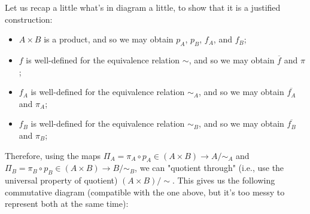 \documentclass[12pt, letterpaper, twoside]{report}
\begin{document}

Let us recap a little what's in diagram a little, to show that it is a justified construction:
\begin{itemize}
	\item $A \times B$ is a product, and so we may obtain $p_A$, $p_B$, $f_A$, and $f_B$;
    \item $f$ is well-defined for the equivalence relation $\sim$, and so we may obtain $\overline{f}$ and $\pi$;
    \item $f_A$ is well-defined for the equivalence relation $\sim_A$, and so we may obtain $\overline{f_A}$ and $\pi_A$;
    \item $f_B$ is well-defined for the equivalence relation $\sim_B$, and so we may obtain $\overline{f_B}$ and $\pi_B$;
\end{itemize}

Therefore, using the maps $\Pi_A = \pi_A \circ p_A \in (A \times B) \to A/\sim_A$ and $\Pi_B = \pi_B \circ p_B \in (A \times B) \to B/\sim_B$, we can "quotient through" (i.e., use the universal property of quotient) $(A \times B)/\sim$. This gives us the following commutative diagram (compatible with the one above, but it's too messy to represent both at the same time):
\end{document}

